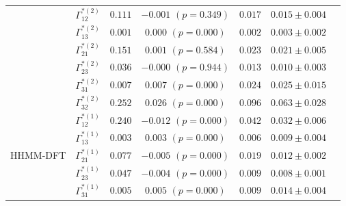 \documentclass{article}
\begin{document}
\begin{center}
{\begin{tabular}{ccccccc}
                             & $\Gamma^{*(2)}_{12}$          & $0.111$                         & $-0.001$ $(p=0.349)$        & $0.017$                           & $0.015 \pm 0.004$                             \\
                             & $\Gamma^{*(2)}_{13}$          & $0.001$                         & $0.000$ $(p=0.000)$        & $0.002$                           & $0.003 \pm 0.002$                             \\
                             & $\Gamma^{*(2)}_{21}$          & $0.151$                         & $0.001$ $(p=0.584)$        & $0.023$                           & $0.021 \pm 0.005$                             \\
                             & $\Gamma^{*(2)}_{23}$          & $0.036$                         & $-0.000$ $(p=0.944)$        & $0.013$                           & $0.010 \pm 0.003$                             \\
                             & $\Gamma^{*(2)}_{31}$          & $0.007$                         & $0.007$ $(p=0.000)$        & $0.024$                           & $0.025 \pm 0.015$                             \\
                             & $\Gamma^{*(2)}_{32}$          & $0.252$                         & $0.026$ $(p=0.000)$        & $0.096$                           & $0.063 \pm 0.028$                             \\ \hline
\multirow{12}{*}{HHMM-DFT}   & $\Gamma^{*(1)}_{12}$          & $0.240$                         & $-0.012$ $(p=0.000)$        & $0.042$                           & $0.032 \pm 0.006$                             \\
                             & $\Gamma^{*(1)}_{13}$          & $0.003$                         & $0.003$ $(p=0.000)$        & $0.006$                           & $0.009 \pm 0.004$                             \\
                             & $\Gamma^{*(1)}_{21}$          & $0.077$                         & $-0.005$ $(p=0.000)$        & $0.019$                           & $0.012 \pm 0.002$                             \\
                             & $\Gamma^{*(1)}_{23}$          & $0.047$                         & $-0.004$ $(p=0.000)$        & $0.009$                           & $0.008 \pm 0.001$                             \\
                             & $\Gamma^{*(1)}_{31}$          & $0.005$                         & $0.005$ $(p=0.000)$        & $0.009$                           & $0.014 \pm 0.004$                             \\

\end{tabular}}
\end{center}
\end{document}
